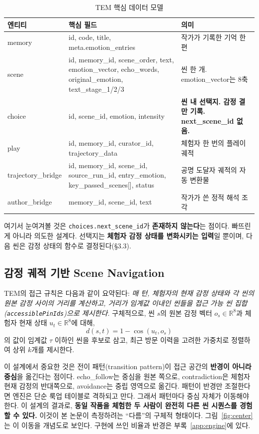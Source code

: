 \documentclass[11pt, a4paper]{article}
\begin{document}
\begin{table}[H]
\centering
\caption{TEM 핵심 데이터 모델}
\label{tab:datamodel}
\small
\begin{tabular}{l p{6.4cm} p{4.4cm}}
\toprule
\textbf{엔티티} & \textbf{핵심 필드} & \textbf{의미} \\
\midrule
memory & id, code, title, meta.emotion\_entries & 작가가 기록한 기억 한 편 \\
scene & id, memory\_id, scene\_order, text, emotion\_vector, echo\_words, original\_emotion, text\_stage\_1/2/3 & 씬 한 개. emotion\_vector는 8축 \\
choice & id, scene\_id, emotion, intensity & \textbf{씬 내 선택지. 감정 결만 기록. next\_scene\_id 없음.} \\
play & id, memory\_id, curator\_id, trajectory\_data & 체험자 한 번의 플레이 궤적 \\
trajectory\_bridge & id, memory\_id, scene\_id, source\_run\_id, entry\_emotion, key\_passed\_scenes[], status & 공명 도달자 궤적의 자동 변환물 \\
author\_bridge & memory\_id, scene\_id, text & 작가가 쓴 정적 해석 조각 \\
\bottomrule
\end{tabular}
\end{table}

여기서 눈여겨볼 것은 \texttt{choices.next\_scene\_id}가 \textbf{존재하지 않는다}는 점이다. 빠뜨린 게 아니라 의도한 설계다. 선택지는 \textbf{체험자 감정 상태를 변화시키는 입력}일 뿐이며, 다음 씬은 감정 상태의 함수로 결정된다(\S3.3).

\subsection{감정 궤적 기반 Scene Navigation}

TEM의 접근 규칙은 다음과 같이 요약된다: \textit{매 턴, 체험자의 현재 감정 상태와 각 씬의 원본 감정 사이의 거리를 계산하고, 거리가 임계값 이내인 씬들을 접근 가능 씬 집합(\texttt{accessiblePinIds})으로 제시한다.} 구체적으로, 씬 $s$의 원본 감정 벡터 $o_s \in \mathbb{R}^8$과 체험자 현재 상태 $u_t \in \mathbb{R}^8$에 대해,
\begin{equation}
d(s, t) = 1 - \cos(u_t, o_s)
\end{equation}
의 값이 임계값 $\tau$ 이하인 씬을 후보로 삼고, 최근 방문 이력을 고려한 가중치로 정렬하여 상위 $k$개를 제시한다.

이 설계에서 중요한 것은 전이 패턴(transition pattern)이 접근 공간의 \textbf{반경이 아니라 중심}을 옮긴다는 점이다. echo\_follow는 중심을 원본 쪽으로, contradiction은 체험자 현재 감정의 반대쪽으로, avoidance는 중립 영역으로 옮긴다. 패턴이 반경만 조절한다면 엔진은 단순 룩업 테이블로 격하되고 만다. 그래서 패턴마다 중심 자체가 이동해야 한다. 이 설계의 결과로, \textbf{동일 작품을 체험한 두 사람이 완전히 다른 씬 시퀀스를 경험할 수 있다.} 이것이 본 논문이 측정하려는 ``다름''의 구체적 형태이다. 그림~\ref{fig:center}는 이 이동을 개념도로 보인다. 구현에 쓰인 비율과 반경은 부록~\ref{app:engine}에 있다.
\end{document}
